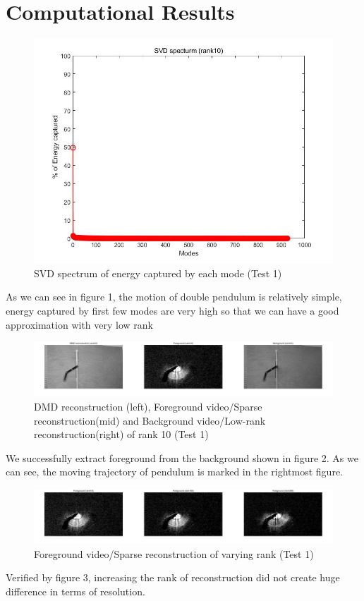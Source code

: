 \documentclass[11pt,a4paper]{article}
\numberwithin{equation}{subsection}
\begin{document}
\section{Computational Results}
\begin{figure}[H]
\begin{center}
\includegraphics[scale=0.25]{t1f0.jpg}
\caption{SVD spectrum of energy captured by each mode (Test 1)}
\end{center}
\end{figure}
As we can see in figure 1, the motion of double pendulum is relatively simple, energy captured by first few modes are very high so that we can have a good approximation with very low rank

\begin{figure}[H]
\begin{center}
\includegraphics[scale=0.17]{t1f1.jpg}
\caption{DMD reconstruction (left), Foreground video/Sparse reconstruction(mid) and Background video/Low-rank reconstruction(right) of rank 10 (Test 1)}
\end{center}
\end{figure}
We successfully extract foreground from the background shown in figure 2. As we can see, the moving trajectory of pendulum is marked in the rightmost figure.
\begin{figure}[H]
\begin{center}
\includegraphics[scale=0.17]{t1f2.jpg}
\caption{Foreground video/Sparse reconstruction of varying rank (Test 1)}
\end{center}
\end{figure}
Verified by figure 3, increasing the rank of reconstruction did not create huge difference in terms of resolution.
\end{document}
